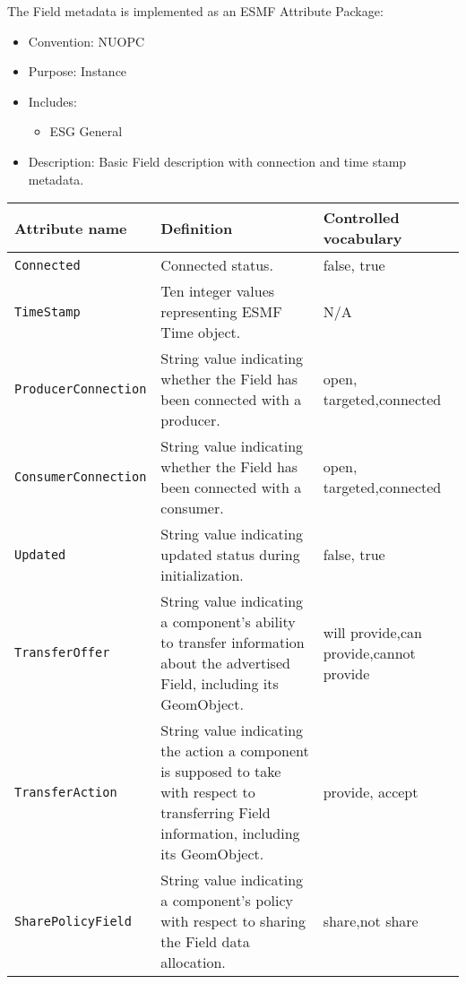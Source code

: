 \label{FieldMeta}
The Field metadata is implemented as an ESMF Attribute Package:

\begin{itemize}
    \item Convention: NUOPC
    \item Purpose: Instance
    \item Includes:
    \begin{itemize}
        \item ESG General
    \end{itemize} 
    \item Description: Basic Field description with connection and time stamp metadata. 
\end{itemize}

\begin{longtable}{|p{}|p{}|p{}|}
     \hline\hline
     {\bf Attribute name} & {\bf Definition} & {\bf Controlled vocabulary}\\
     \hline\hline
     {\tt Connected} & Connected status.& false, true\\ \hline
     {\tt TimeStamp} & Ten integer values representing ESMF Time object.& N/A\\ \hline
     {\tt ProducerConnection} & String value indicating whether the Field has been connected with a producer. & open, targeted,\newline connected\\ \hline
     {\tt ConsumerConnection} & String value indicating whether the Field has been connected with a consumer.& open, targeted,\newline connected\\ \hline
     {\tt Updated} & String value indicating updated status during initialization.& false, true\\ \hline
     {\tt TransferOffer} & String value indicating a component's ability to transfer information about the advertised Field, including its GeomObject.& will provide,\newline can provide,\newline cannot provide\\ \hline
     {\tt TransferAction} & String value indicating the action a component is supposed to take with respect to transferring Field information, including its GeomObject.& provide, accept\\ \hline
     {\tt SharePolicyField} & String value indicating a component's policy with respect to sharing the Field data allocation.& share,\newline not share\\ \hline

\end{longtable}
